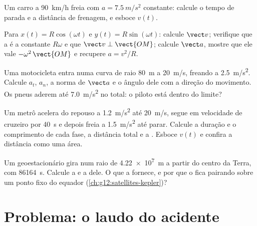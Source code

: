 \begin{exercise}[$\star\star$]\label{exo:g12:kinematics-2d:11}
Um carro a \qty{90}{km/h} freia com $a = \qty{7.5}{m/s^2}$ constante:
calcule o tempo de parada e a distância de frenagem, e esboce $v(t)$.
\end{exercise}

\begin{exercise}[$\star\star\star$]\label{exo:g12:kinematics-2d:12}
Para $x(t) = R\cos(\omega t)$ e $y(t) = R\sin(\omega t)$: calcule
$\vect v$; verifique que a  é a constante $R\omega$ e
que $\vect v \perp \vect{OM}$; calcule $\vect a$, mostre que ele vale
$-\omega^2\,\vect{OM}$ e recupere $a = v^2/R$.
\end{exercise}

\begin{exercise}[$\star\star\star$]\label{exo:g12:kinematics-2d:13}
Uma motocicleta entra numa curva de raio \qty{80}{m} a \qty{20}{m/s},
freando a \qty{2.5}{m/s^2}. Calcule $a_t$, $a_n$, a norma de $\vect a$ e
o ângulo dele com a direção do movimento. Os pneus aderem até
\qty{7.0}{m/s^2} no total: o piloto está dentro do limite?
\end{exercise}

\begin{exercise}[$\star\star\star$]\label{exo:g12:kinematics-2d:14}
Um metrô acelera do repouso a \qty{1.2}{m/s^2} até \qty{20}{m/s}, segue
em velocidade de cruzeiro por \qty{40}{s} e depois freia a
\qty{1.5}{m/s^2} até parar. Calcule a duração e o comprimento de cada
fase, a distância total e a . Esboce $v(t)$ e confira a
distância como uma área.
\end{exercise}

\begin{exercise}[$\star\star\star$]\label{exo:g12:kinematics-2d:15}
Um  geoestacionário gira num raio de \qty{4.22e7}{m} a partir do
centro da Terra, com  \qty{86164}{s}. Calcule a 
e a  dele. O que a fornece, e por que o  fica
pairando sobre um ponto fixo do equador
(\cref{ch:g12:satellites-kepler})?
\end{exercise}

\section{Problema: o laudo do acidente}

